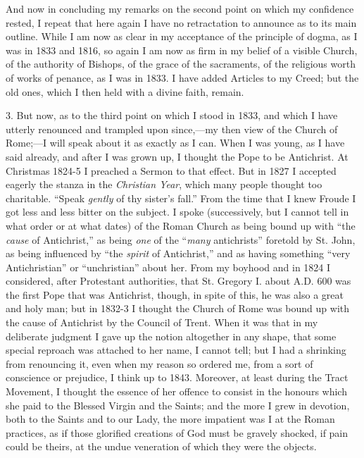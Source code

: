 And now in concluding my remarks on the second point on which my
confidence rested, I repeat that here again I have no
retractation to announce as to its main outline. While I am now as clear
in my acceptance of the principle of dogma, as I was in 1833 and 1816,
so again I am now as firm in my belief of a visible Church, of the
authority of Bishops, of the grace of the sacraments, of the religious
worth of works of penance, as I was in 1833. I have added Articles to my
Creed; but the old ones, which I then held with a divine faith, remain.

3. But now, as to the third point on which I stood in 1833, and which
I have utterly renounced and trampled upon since,—my then view of the
Church of Rome;—I will speak about it as exactly as I can. When I was
young, as I have said already, and after I was grown up, I thought the
Pope to be Antichrist. At Christmas 1824-5 I preached a Sermon to that
effect. But in 1827 I accepted eagerly the stanza in the \emph{Christian Year}, which many people thought too charitable. ``Speak \emph{gently}
of thy sister's fall.'' From the time that I knew Froude I got less
and less bitter on the subject. I spoke (successively, but I cannot tell
in what order or at what dates) of the Roman Church as being bound up
with ``the \emph{cause} of Antichrist,'' as being \emph{one} of
the ``\emph{many} antichrists'' foretold by St. John, as being
influenced by ``the \emph{spirit} of Antichrist,'' and as having
something ``very Antichristian'' or ``unchristian''
about her. From my boyhood and in 1824 I considered, after Protestant
authorities, that St. Gregory I. about A.D. 600 was the first Pope that
was Antichrist, though, in spite of this, he was also a great and holy
man; but in 1832-3 I thought the Church of Rome was bound up
with the cause of Antichrist by the Council of Trent. When it was that
in my deliberate judgment I gave up the notion altogether in any
shape, that some special reproach was attached to her name, I cannot
tell; but I had a shrinking from renouncing it, even when my reason so
ordered me, from a sort of conscience or prejudice, I think up to 1843.
Moreover, at least during the Tract Movement, I thought the essence of
her offence to consist in the honours which she paid to the Blessed
Virgin and the Saints; and the more I grew in devotion, both to the
Saints and to our Lady, the more impatient was I at the Roman practices,
as if those glorified creations of God must be gravely shocked, if pain
could be theirs, at the undue veneration of which they were the objects.

